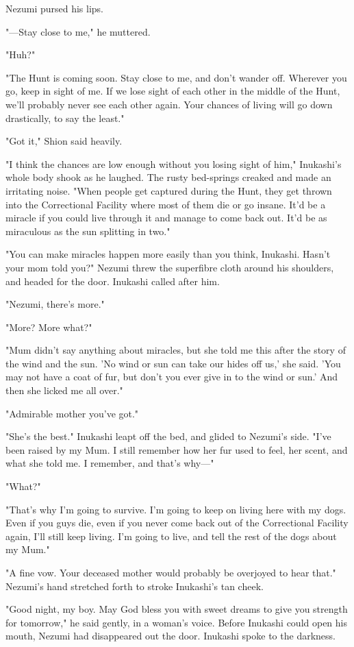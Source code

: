 Nezumi pursed his lips.

"---Stay close to me," he muttered.

"Huh?"

"The Hunt is coming soon. Stay close to me, and don't wander off.
Wherever you go, keep in sight of me. If we lose sight of each other in
the middle of the Hunt, we'll probably never see each other again. Your
chances of living will go down drastically, to say the least."

"Got it," Shion said heavily.

"I think the chances are low enough without you losing sight of him,"
Inukashi's whole body shook as he laughed. The rusty bed-springs creaked
and made an irritating noise. "When people get captured during the Hunt,
they get thrown into the Correctional Facility where most of them die or
go insane. It'd be a miracle if you could live through it and manage to
come back out. It'd be as miraculous as the sun splitting in two."

"You can make miracles happen more easily than you think, Inukashi.
Hasn't your mom told you?" Nezumi threw the superfibre cloth around his
shoulders, and headed for the door. Inukashi called after him.

"Nezumi, there's more."

"More? More what?"

"Mum didn't say anything about miracles, but she told me this after the
story of the wind and the sun. 'No wind or sun can take our hides off
us,' she said. 'You may not have a coat of fur, but don't you ever give
in to the wind or sun.' And then she licked me all over."

"Admirable mother you've got."

"She's the best." Inukashi leapt off the bed, and glided to Nezumi's
side. "I've been raised by my Mum. I still remember how her fur used to
feel, her scent, and what she told me. I remember, and that's why---"

"What?"

"That's why I'm going to survive. I'm going to keep on living here with
my dogs. Even if you guys die, even if you never come back out of the
Correctional Facility again, I'll still keep living. I'm going to live,
and tell the rest of the dogs about my Mum."

"A fine vow. Your deceased mother would probably be overjoyed to hear
that." Nezumi's hand stretched forth to stroke Inukashi's tan cheek.

"Good night, my boy. May God bless you with sweet dreams to give you
strength for tomorrow," he said gently, in a woman's voice. Before
Inukashi could open his mouth, Nezumi had disappeared out the door.
Inukashi spoke to the darkness.


